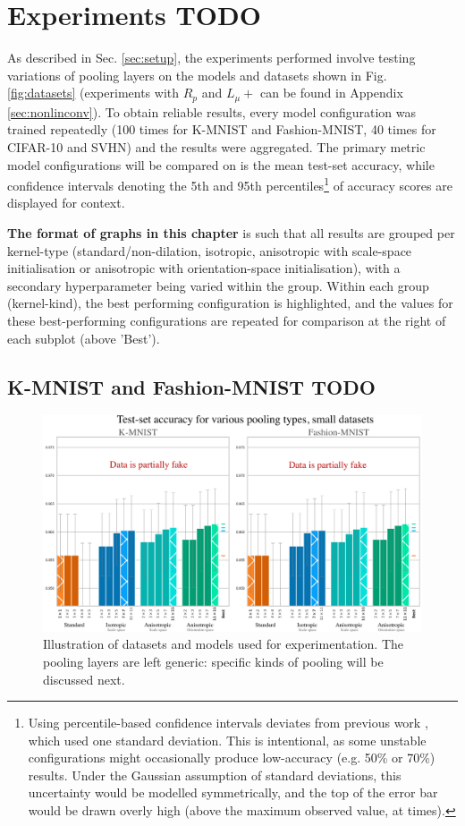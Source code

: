 \documentclass[a4paper, 12pt]{report}
\def\comment#1{\color{red}#1\color{black}}
\begin{document}
\chapter{Experiments \comment{TODO}}
As described in Sec. \ref{sec:setup}, the experiments performed involve testing variations of pooling layers on the models and datasets shown in Fig. \ref{fig:datasets} (experiments with $R_p$ and $L_\mu+$ can be found in Appendix \ref{sec:nonlinconv}).
To obtain reliable results, every model configuration was trained repeatedly (100 times for K-MNIST and Fashion-MNIST, 40 times for CIFAR-10 and SVHN) and the results were aggregated. The primary metric model configurations will be compared on is the mean test-set accuracy, while confidence intervals denoting the 5th and 95th percentiles\footnote{Using percentile-based confidence intervals deviates from previous work \cite{thierrybsc, koenbsc}, which used one standard deviation. This is intentional, as some unstable configurations might occasionally produce low-accuracy (e.g. 50\% or 70\%) results. Under the Gaussian assumption of standard deviations, this uncertainty would be modelled symmetrically, and the top of the error bar would be drawn overly high (above the maximum observed value, at times).} of accuracy scores are displayed for context.

\textbf{The format of graphs in this chapter} is such that all results are grouped per kernel-type (standard/non-dilation, isotropic, anisotropic with scale-space initialisation or anisotropic with orientation-space initialisation), with a secondary hyperparameter being varied within the group. Within each group (kernel-kind), the best performing configuration is highlighted, and the values for these best-performing configurations are repeated for comparison at the right of each subplot (above 'Best').
\section{K-MNIST and Fashion-MNIST  \comment{TODO}}


\newpage
\begin{figure}[ht!]
	\center
  \includegraphics[width=1\textwidth]{figures/results-small.png}
  \caption{Illustration of datasets and models used for experimentation.
  The pooling layers are left generic: specific kinds of pooling will be discussed next. }
  \label{fig:res-small}
\end{figure}
\end{document}
